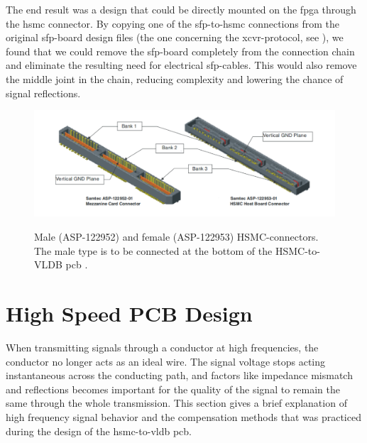 \documentclass[main.tex]{subfiles}
\begin{document}
The end result was a design that could be directly mounted on the \gls{fpga} through the \gls{hsmc} connector. By copying one of the \gls{sfp}-to-\gls{hsmc} connections from the original \gls{sfp}-board design files (the one concerning the \gls{xcvr}-protocol, see \cite{sfp_schem}), we found that we could remove the \gls{sfp}-board completely from the connection chain and eliminate the resulting need for electrical \gls{sfp}-cables. This would also remove the middle joint in the chain, reducing complexity and lowering the chance of signal reflections. %

\begin{figure}[ht] %
\includegraphics[width=\linewidth]{../img/HSMC_52_53_hsmcspec}  \\[0.1 cm]
\caption{Male (ASP-122952) and female (ASP-122953) HSMC-connectors. The male type is to be connected at the bottom of the HSMC-to-VLDB \gls{pcb} \cite[Figure 2-1]{altera_hsmc09}.}
\label{fig:hsmc}
\end{figure}

\section{High Speed PCB Design}

When transmitting signals through a conductor at high frequencies, the conductor no longer acts as an ideal wire. The signal voltage stops acting instantaneous across the conducting path, and factors like impedance mismatch and reflections becomes important for the quality of the signal to remain the same through the whole transmission. This section gives a brief explanation of high frequency signal behavior and the compensation methods that was practiced during the design of the \gls{hsmc}-to-\gls{vldb} \gls{pcb}.
\end{document}
